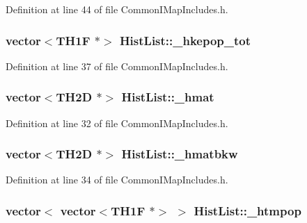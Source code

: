 Definition at line 44 of file Common\-I\-Map\-Includes.\-h.

\hypertarget{struct_hist_list_a40a0f18234c183dc824b1aab79418963}{
\subsubsection[{\-\_\-hkepop\-\_\-tot}]{\setlength{\rightskip}{0pt plus 5cm}vector$<$T\-H1\-F $\ast$$>$ Hist\-List\-::\-\_\-hkepop\-\_\-tot}}\label{struct_hist_list_a40a0f18234c183dc824b1aab79418963}


Definition at line 37 of file Common\-I\-Map\-Includes.\-h.

\hypertarget{struct_hist_list_ac3388ca64a9d4835da79f8ead974b390}{
\subsubsection[{\-\_\-hmat}]{\setlength{\rightskip}{0pt plus 5cm}vector$<$T\-H2\-D $\ast$$>$ Hist\-List\-::\-\_\-hmat}}\label{struct_hist_list_ac3388ca64a9d4835da79f8ead974b390}


Definition at line 32 of file Common\-I\-Map\-Includes.\-h.

\hypertarget{struct_hist_list_adf971866b4d568c49110a6e0fc3e0cc8}{
\subsubsection[{\-\_\-hmatbkw}]{\setlength{\rightskip}{0pt plus 5cm}vector$<$T\-H2\-D $\ast$$>$ Hist\-List\-::\-\_\-hmatbkw}}\label{struct_hist_list_adf971866b4d568c49110a6e0fc3e0cc8}


Definition at line 34 of file Common\-I\-Map\-Includes.\-h.

\hypertarget{struct_hist_list_a90356e2c271e5be23bc283fc5886a948}{
\subsubsection[{\-\_\-htmpop}]{\setlength{\rightskip}{0pt plus 5cm}vector$<$ vector$<$T\-H1\-F $\ast$$>$ $>$ Hist\-List\-::\-\_\-htmpop}}\label{struct_hist_list_a90356e2c271e5be23bc283fc5886a948}


